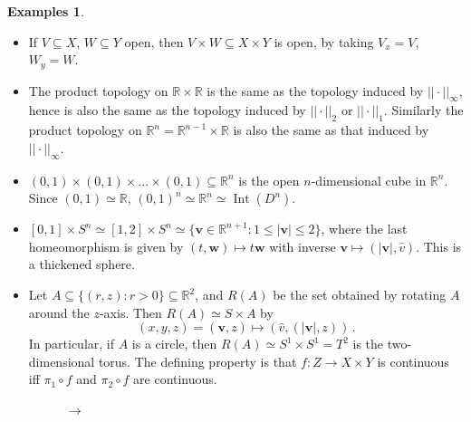 \documentclass[a4paper,11pt]{article}
\theoremstyle{definition}
\newtheorem*{exs}{Examples}
\DeclareMathOperator{\Int}{Int}
\numberwithin{equation}{section}
\begin{document}
\begin{exs}
\leavevmode
\begin{itemize}
    \item If $V\subseteq X$, $W\subseteq Y$ open, then $V\times W\subseteq X\times Y$ is open, by taking $V_x=V$, $W_y=W$.
    \item The product topology on $\mathbb{R}\times\mathbb{R}$ is the same as the topology induced by $||\cdot||_\infty$, hence is also the same as the topology induced by $||\cdot||_2$ or $||\cdot||_1$. Similarly the product topology on $\mathbb{R}^n=\mathbb{R}^{n-1}\times\mathbb{R}$ is also the same as that induced by $||\cdot||_\infty$.
    \item $(0,1)\times(0,1)\times...\times(0,1)\subseteq\mathbb{R}^n$ is the open $n$-dimensional cube in $\mathbb{R}^n$. Since $(0,1)\simeq\mathbb{R}$, $(0,1)^n\simeq\mathbb{R}^n\simeq\Int(D^n)$.
    \item $[0,1]\times S^n\simeq[1,2]\times S^n\simeq\{\mathbf{v}\in\mathbb{R}^{n+1}:1\leq|\mathbf{v}|\leq 2\}$, where the last homeomorphism is given by $(t,\mathbf{w})\mapsto t\mathbf{w}$ with inverse $\mathbf{v}\mapsto(|\mathbf{v}|,\hat{v})$. This is a thickened sphere.
    \item Let $A\subseteq\{(r,z):r>0\}\subseteq\mathbb{R}^2$, and $R(A)$ be the set obtained by rotating $A$ around the $z$-axis. Then $R(A)\simeq S\times A$ by 
    \[
    (x,y,z)=(\mathbf{v},z)\mapsto(\hat{v},(|\mathbf{v}|,z))\,.
    \]
    In particular, if $A$ is a circle, then $R(A)\simeq S^1\times S^1=T^2$ is the two-dimensional torus. The defining property is that $f:Z\rightarrow X\times Y$ is continuous iff $\pi_1\circ f$ and $\pi_2\circ f$ are continuous.
    \begin{figure}[h]
        \centering
        \begin{minipage}{.47\textwidth}
        \centering
        \end{minipage}
        {\LARGE$\rightarrow$}
        \begin{minipage}{.47\textwidth}
        \centering

\end{minipage}
\end{figure}
\end{itemize}
\end{exs}
\end{document}
